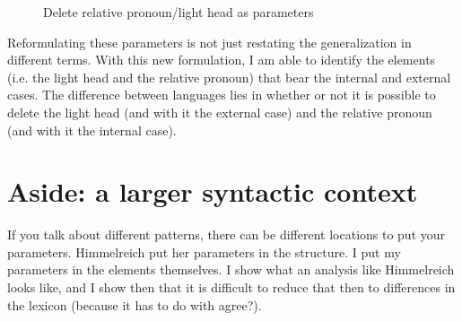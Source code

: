 \begin{figure}[htbp]
  \centering
    \footnotesize{
    }
    \caption{Delete relative pronoun/light head as parameters}
    \label{fig:two-parameters-different}
\end{figure}

Reformulating these parameters is not just restating the generalization in different terms. With this new formulation, I am able to identify the elements (i.e. the light head and the relative pronoun) that bear the internal and external cases. The difference between languages lies in whether or not it is possible to delete the light head (and with it the external case) and the relative pronoun (and with it the internal case).





\section{Aside: a larger syntactic context}\label{sec:larger-syntax}

If you talk about different patterns, there can be different locations to put your parameters. Himmelreich put her parameters in the structure. I put my parameters in the elements themselves. I show what an analysis like Himmelreich looks like, and I show then that it is difficult to reduce that then to differences in the lexicon (because it has to do with agree?).

